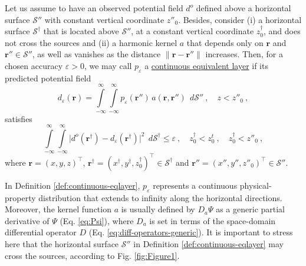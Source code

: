 \begin{definition}
	Let us assume to have an observed potential field $d^{o}$ defined above 
	a horizontal surface $\mathcal{S}''$ with constant vertical coordinate $z''_{0}$. 
	Besides, consider (i) a horizontal surface $\mathcal{S}^{\dagger}$ that is located above 
	$\mathcal{S}''$, at a constant vertical coordinate $z^{\dagger}_{0}$, 
	and does not cross the sources and (ii) a harmonic kernel 
	$a$ that depends only on $\mathbf{r}$ and $\mathbf{r}'' \in \mathcal{S}''$, as well as 
	vanishes as the distance $\| \mathbf{r} - \mathbf{r}'' \|$ increases. 
	Then, for a chosen accuracy $\varepsilon > 0$, we may call $p_{\varepsilon}$ 
	a \underline{continuous equivalent layer} if its predicted potential field 
	\begin{equation}
		d_{\varepsilon}(\mathbf{r})
		= \int\limits_{-\infty}^{\infty}\int\limits_{-\infty}^{\infty}
		p_{\varepsilon}(\mathbf{r}'') \, a(\mathbf{r}, \mathbf{r}'') \:\: d\mathcal{S}''
		\: , \quad z < z''_{0} \: ,
		\label{eq:predicted-data-continuous-layer}
	\end{equation}
	satisfies 
	\begin{equation}
		\int\limits_{-\infty}^{\infty} \int\limits_{-\infty}^{\infty}
		\vert d^{o}(\mathbf{r}^{\dagger}) - 
		d_{\varepsilon}(\mathbf{r}^{\dagger}) \vert^{2}
		\:\: d\mathcal{S}^{\dagger} \le \varepsilon \: ,
		\quad z^{\dagger}_{0} < z^{t}_{0} \: , \quad z^{\dagger}_{0} < z''_{0} \: ,
		\label{eq:epsilon-bound-data}
	\end{equation}
	where $\mathbf{r} = (x, y, z)^{\top}$, 
	$\mathbf{r}^{\dagger} = (x^{\dagger}, y^{\dagger}, z^{\dagger}_{0})^{\top} \in \mathcal{S}^{\dagger}$ 
	and $\mathbf{r}'' = (x'', y'', z''_{0})^{\top} \in \mathcal{S}''$.
	\label{def:continuous-eqlayer}
\end{definition}

In Definition \ref{def:continuous-eqlayer}, $p_{\varepsilon}$ represents a 
continuous physical-property distribution that extends to infinity along the horizontal 
directions. 
Moreover, the kernel function $a$ is usually defined by $D_{a} \Psi$ 
as a generic partial derivative of $\Psi$ (Eq. \ref{eq:Psi}),
where $D_{a}$ is set in terms of the space-domain differential operator 
$D$ (Eq. \ref{eq:diff-operators-generic}).
It is important to stress here that the horizontal surface $\mathcal{S}''$ in 
Definition \ref{def:continuous-eqlayer} may cross the sources, according to 
Fig. \ref{fig:Figure1}.

